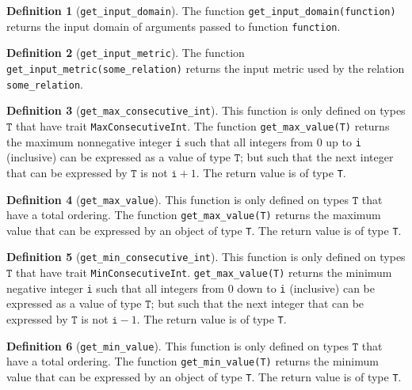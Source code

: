 \documentclass[11pt,a4paper]{article}
\theoremstyle{definition}
\newtheorem{definition}{Definition}[section]
\newcommand{\T}{\texttt{T}}
\begin{document}
\begin{definition}[\texttt{get\_input\_domain}]
    The function \texttt{get\_input\_domain(function)} returns the input domain of arguments passed to function \texttt{function}.
\end{definition}

\begin{definition}[\texttt{get\_input\_metric}]
    The function \texttt{get\_input\_metric(some\_relation)} returns the input metric used by the relation \texttt{some\_relation}.
\end{definition}

\begin{definition}[\texttt{get\_max\_consecutive\_int}]
    This function is only defined on types $\T$ that have trait \texttt{MaxConsecutiveInt}. The function \texttt{get\_max\_value(T)} returns the maximum nonnegative integer \texttt{i} such that all integers from 0 up to \texttt{i} (inclusive) can be expressed as a value of type $\T$; but such that the next integer that can be expressed by $\T$ is not $\texttt{i}+1$. The return value is of type \texttt{T}.
\end{definition}

\begin{definition}[\texttt{get\_max\_value}]
    This function is only defined on types $\T$ that have a total ordering. The function \texttt{get\_max\_value(T)} returns the maximum value that can be expressed by an object of type \texttt{T}. The return value is of type \texttt{T}.
\end{definition}

\begin{definition}[\texttt{get\_min\_consecutive\_int}]
    This function is only defined on types $\T$ that have trait \texttt{MinConsecutiveInt}.   \texttt{get\_max\_value(T)} returns the minimum negative integer \texttt{i} such that all integers from 0 down to \texttt{i} (inclusive) can be expressed as a value of type $\T$; but such that the next integer that can be expressed by $\T$ is not $\texttt{i}-1$. The return value is of type \texttt{T}.
\end{definition}

\begin{definition}[\texttt{get\_min\_value}]
    This function is only defined on types $\T$ that have a total ordering. The function \texttt{get\_min\_value(T)} returns the minimum value that can be expressed by an object of type \texttt{T}. The return value is of type \texttt{T}.
\end{definition}
\end{document}
